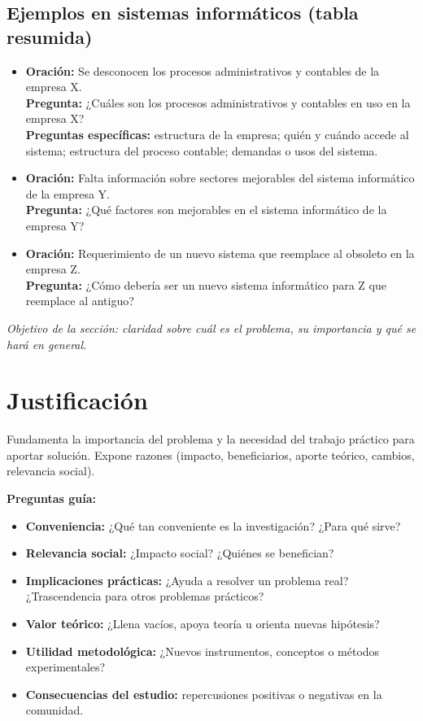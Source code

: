\documentclass[a4paper,11pt]{book}
\begin{document}
\subsection*{Ejemplos en sistemas informáticos (tabla resumida)}
\begin{itemize}[leftmargin=*]
  \item \textbf{Oración:} Se desconocen los procesos administrativos y contables de la empresa X.\\
        \textbf{Pregunta:} ¿Cuáles son los procesos administrativos y contables en uso en la empresa X?\\
        \textbf{Preguntas específicas:} estructura de la empresa; quién y cuándo accede al sistema; estructura del proceso contable; demandas o usos del sistema.
  \item \textbf{Oración:} Falta información sobre sectores mejorables del sistema informático de la empresa Y.\\
        \textbf{Pregunta:} ¿Qué factores son mejorables en el sistema informático de la empresa Y?
  \item \textbf{Oración:} Requerimiento de un nuevo sistema que reemplace al obsoleto en la empresa Z.\\
        \textbf{Pregunta:} ¿Cómo debería ser un nuevo sistema informático para Z que reemplace al antiguo?
\end{itemize}

\textit{Objetivo de la sección: claridad sobre cuál es el problema, su importancia y qué se hará en general.}

\section{Justificación}
Fundamenta la importancia del problema y la necesidad del trabajo práctico para aportar solución. Expone razones (impacto, beneficiarios, aporte teórico, cambios, relevancia social).

\textbf{Preguntas guía:}
\begin{itemize}[leftmargin=*]
  \item \textbf{Conveniencia:} ¿Qué tan conveniente es la investigación? ¿Para qué sirve?
  \item \textbf{Relevancia social:} ¿Impacto social? ¿Quiénes se benefician?
  \item \textbf{Implicaciones prácticas:} ¿Ayuda a resolver un problema real? ¿Trascendencia para otros problemas prácticos?
  \item \textbf{Valor teórico:} ¿Llena vacíos, apoya teoría u orienta nuevas hipótesis?
  \item \textbf{Utilidad metodológica:} ¿Nuevos instrumentos, conceptos o métodos experimentales?
  \item \textbf{Consecuencias del estudio:} repercusiones positivas o negativas en la comunidad.
\end{itemize}
\end{document}
